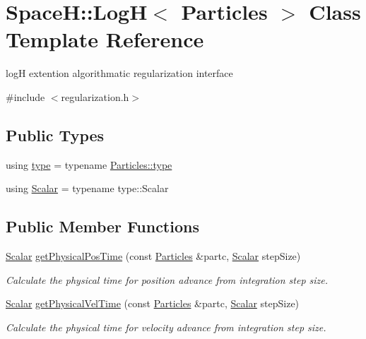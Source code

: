 \hypertarget{class_space_h_1_1_log_h}{}\section{SpaceH\+:\+:LogH$<$ Particles $>$ Class Template Reference}
\label{class_space_h_1_1_log_h}


logH extention algorithmatic regularization interface  




{\ttfamily \#include $<$regularization.\+h$>$}

\subsection*{Public Types}
\begin{DoxyCompactItemize}
\item 
using \mbox{\hyperlink{class_space_h_1_1_log_h_a9d445f78b1c815836820de45771a6772}{type}} = typename \mbox{\hyperlink{class_space_h_1_1_vel_indep_particles_a09aa167b5fb1b203ab021220601ed74c}{Particles\+::type}}
\item 
using \mbox{\hyperlink{class_space_h_1_1_log_h_a930675187172d40c888b4b2c94f0bff5}{Scalar}} = typename type\+::\+Scalar
\end{DoxyCompactItemize}
\subsection*{Public Member Functions}
\begin{DoxyCompactItemize}
\item 
\mbox{\hyperlink{class_space_h_1_1_log_h_a930675187172d40c888b4b2c94f0bff5}{Scalar}} \mbox{\hyperlink{class_space_h_1_1_log_h_a57e53ea3152d08ebb3153bd42a71e3a8}{get\+Physical\+Pos\+Time}} (const \mbox{\hyperlink{struct_space_h_1_1_particles}{Particles}} \&partc, \mbox{\hyperlink{class_space_h_1_1_log_h_a930675187172d40c888b4b2c94f0bff5}{Scalar}} step\+Size)
\begin{DoxyCompactList}\small\item\em Calculate the physical time for position advance from integration step size. \end{DoxyCompactList}\item 
\mbox{\hyperlink{class_space_h_1_1_log_h_a930675187172d40c888b4b2c94f0bff5}{Scalar}} \mbox{\hyperlink{class_space_h_1_1_log_h_a04cad522588d52045507735376308301}{get\+Physical\+Vel\+Time}} (const \mbox{\hyperlink{struct_space_h_1_1_particles}{Particles}} \&partc, \mbox{\hyperlink{class_space_h_1_1_log_h_a930675187172d40c888b4b2c94f0bff5}{Scalar}} step\+Size)
\begin{DoxyCompactList}\small\item\em Calculate the physical time for velocity advance from integration step size. \end{DoxyCompactList}\end{DoxyCompactItemize}


